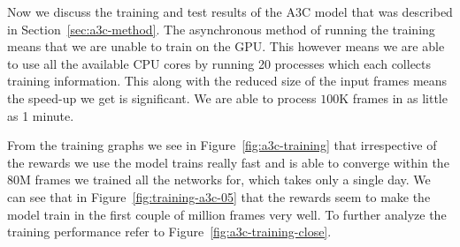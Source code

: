 Now we discuss the training and test results of the A3C model that was described in Section~\ref{sec:a3c-method}. The asynchronous method of running the training means that we are unable to train on the GPU. This however means we are able to use all the available CPU cores by running 20 processes which each collects training information. This along with the reduced size of the input frames means the speed-up we get is significant. We are able to process $100$K frames in as little as 1 minute.

\medskip
\noindent
From the training graphs we see in Figure~\ref{fig:a3c-training} that irrespective of the rewards we use the model trains really fast and is able to converge within the $80$M frames we trained all the networks for, which takes only a single day. We can see that in Figure~\ref{fig:training-a3c-05} that the rewards seem to make the model train in the first couple of million frames very well. To further analyze the training performance refer to Figure~\ref{fig:a3c-training-close}.


